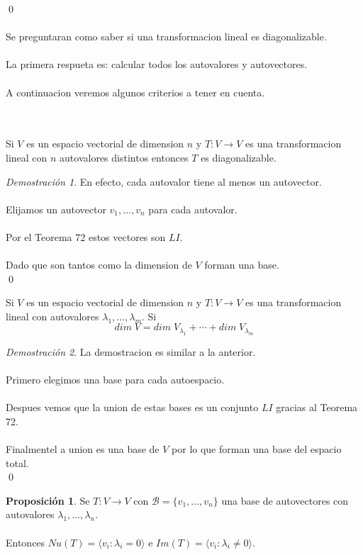 \documentclass{article}
\theoremstyle{definition}
\theoremstyle{definition}
\newtheorem{prop}[teo]{Proposición}
\theoremstyle{remark}
\newtheorem*{demo}{Demostración}
\begin{document}
\qed
\\\\
Se preguntaran como saber si una transformacion lineal es diagonalizable. \\\\ La primera respueta es: calcular todos los autovalores y autovectores. \\\\ A continuacion veremos algunos criterios a tener en cuenta. 
\begin{corol}\; \\\\
  Si $V$ es un espacio vectorial de dimension $n$ y $T : V \to V$ es una transformacion lineal con $n$ autovalores distintos entonces $T$ es diagonalizable.
\end{corol}
\begin{demo}
  En efecto, cada autovalor tiene al menos un autovector. \\\\ Elijamos un autovector $v_1, \dots ,v_n$ para cada autovalor. \\\\ Por el Teorema 72 estos vectores son $LI$. \\\\ Dado que son tantos como la dimension de $V$ forman una base. \\ \qed
\end{demo}
\begin{corol}
  Si $V$ es un espacio vectorial de dimension $n$ y $T : V \to V$ es una transformacion lineal con autovalores $\lambda_1, \dots , \lambda_m$. Si \[
    dim \; V = dim \; V_{\lambda_{1}}+ \cdots + dim \; V_{\lambda_{m}}
  \]
\end{corol}
\begin{demo}
  La demostracion es similar a la anterior. \\\\ Primero elegimos una base para cada autoespacio. \\\\ Despues vemos que la union de estas bases es un conjunto $LI$ gracias al Teorema 72. \\\\ Finalmentel a union es una base de $V$ por 
lo que forman una base del espacio total. \\ \qed \end{demo}
\begin{prop}
  Se $T : V \to V$ con $\mathcal{B}=\{v_1, \dots ,v_n \}$ una base de autovectores con autovalores $\lambda_1, \dots ,\lambda_n$. \\\\ Entonces $Nu(T) = \langle v_i : \lambda_i = 0 \rangle $ e $Im(T)=\langle v_i : \lambda_i \neq 0 \rangle $.
\end{prop}
\end{document}
